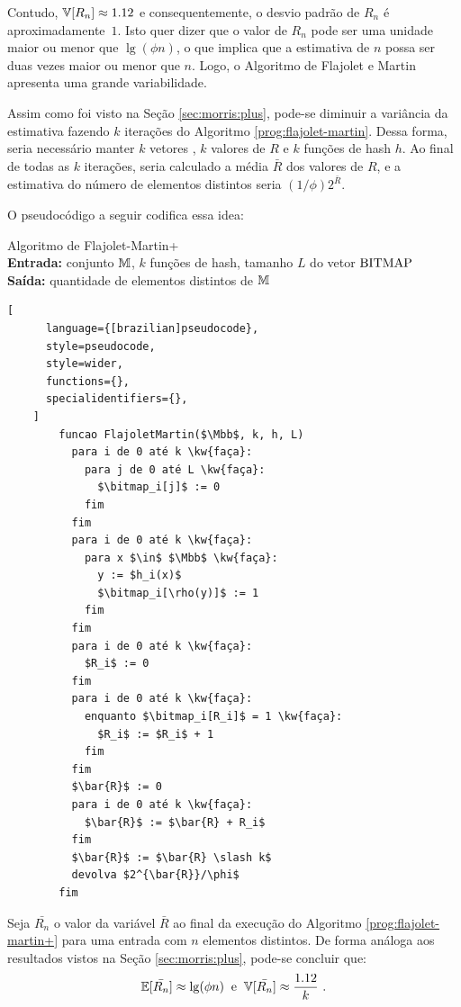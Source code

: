 Contudo, $\Vbb[R_n] \approx\nolinebreak 1.12$ e consequentemente, o desvio padrão de $R_n$ é aproximadamente~$1$. 
Isto quer dizer que o valor de $R_n$ pode ser uma unidade maior ou menor que $\lg(\phi n)$, o que implica que a 
estimativa de $n$ possa ser duas vezes maior ou menor que $n$. Logo, o Algoritmo de Flajolet e Martin apresenta uma 
grande variabilidade.

Assim como foi visto na Seção \ref{sec:morris:plus}, pode-se diminuir a variância da estimativa fazendo $k$ iterações 
do Algoritmo \ref{prog:flajolet-martin}. Dessa forma, seria necessário manter $k$ vetores \bitmap, $k$ valores de $R$ e 
$k$ funções de hash $h$. Ao final de todas as $k$ iterações, seria calculado a média $\bar{R}$ dos valores de $R$, e a 
estimativa do número de elementos distintos seria $(1 \slash \phi) 2^{\bar{R}}$.

O pseudocódigo a seguir codifica essa idea:

\begin{programruledcaption}{
  Algoritmo de Flajolet-Martin+
  \\ \textbf{Entrada:} conjunto $\mathbb{M}$, $k$ funções de hash, tamanho $L$ do vetor $\text{BITMAP}$ 
  \\ \textbf{Saída:} quantidade de elementos distintos de $\mathbb{M}$
  \label{prog:flajolet-martin+}
  }
    \begin{lstlisting}[
      language={[brazilian]pseudocode},
      style=pseudocode,
      style=wider,
      functions={},
      specialidentifiers={},
    ]
        funcao FlajoletMartin($\Mbb$, k, h, L)
          para i de 0 até k \kw{faça}:
            para j de 0 até L \kw{faça}:
              $\bitmap_i[j]$ := 0
            fim
          fim
          para i de 0 até k \kw{faça}:
            para x $\in$ $\Mbb$ \kw{faça}:
              y := $h_i(x)$
              $\bitmap_i[\rho(y)]$ := 1
            fim
          fim
          para i de 0 até k \kw{faça}:
            $R_i$ := 0
          fim
          para i de 0 até k \kw{faça}:
            enquanto $\bitmap_i[R_i]$ = 1 \kw{faça}:
              $R_i$ := $R_i$ + 1
            fim
          fim
          $\bar{R}$ := 0
          para i de 0 até k \kw{faça}:
            $\bar{R}$ := $\bar{R} + R_i$ 
          fim
          $\bar{R}$ := $\bar{R} \slash k$
          devolva $2^{\bar{R}}/\phi$
        fim
    \end{lstlisting}
  \end{programruledcaption}

Seja $\bar{R_n}$ o valor da variável $\bar{R}$ ao final da execução do Algoritmo \ref{prog:flajolet-martin+} para uma
entrada com $n$ elementos distintos. De forma análoga aos resultados vistos na Seção \ref{sec:morris:plus}, pode-se
concluir que:
\[ \Ebb[\bar{R_n}] \approx \lg(\phi n)  \; \; \text{e}  \; \; \Vbb[\bar{R_n}] \approx \frac{1.12}{k} \ . \]


